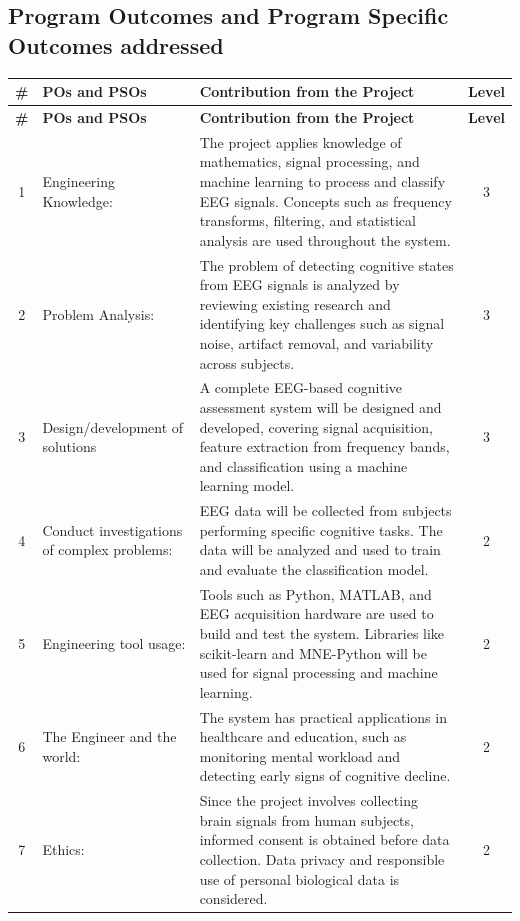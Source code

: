 \begin{appendices}
\chapter{Program Outcomes and Program Specific Outcomes addressed}
\begin{longtable}{|c|p{4cm}|p{7.5cm}|c|}
\hline
\textbf{\#} & \textbf{POs and PSOs} & \textbf{Contribution from the Project} & \textbf{Level} \\
\hline
\endfirsthead

\hline
\textbf{\#} & \textbf{POs and PSOs} & \textbf{Contribution from the Project} & \textbf{Level} \\
\hline
\endhead

\hline
\endfoot

1 & Engineering Knowledge: & The project applies knowledge of mathematics, signal processing, and machine learning to process and classify EEG signals. Concepts such as frequency transforms, filtering, and statistical analysis are used throughout the system. & 3 \\
\hline
2 & Problem Analysis: & The problem of detecting cognitive states from EEG signals is analyzed by reviewing existing research and identifying key challenges such as signal noise, artifact removal, and variability across subjects. & 3 \\
\hline
3 & Design/development of solutions & A complete EEG-based cognitive assessment system will be designed and developed, covering signal acquisition, feature extraction from frequency bands, and classification using a machine learning model. & 3 \\
\hline
4 & Conduct investigations of complex problems: & EEG data will be collected from subjects performing specific cognitive tasks. The data will be analyzed and used to train and evaluate the classification model. & 2 \\
\hline
5 & Engineering tool usage: & Tools such as Python, MATLAB, and EEG acquisition hardware are used to build and test the system. Libraries like scikit-learn and MNE-Python will be used for signal processing and machine learning. & 2 \\
\hline
6 & The Engineer and the world: & The system has practical applications in healthcare and education, such as monitoring mental workload and detecting early signs of cognitive decline. & 2 \\
\hline
7 & Ethics: & Since the project involves collecting brain signals from human subjects, informed consent is obtained before data collection. Data privacy and responsible use of personal biological data is considered. & 2 \\

\end{longtable}
\end{appendices}
